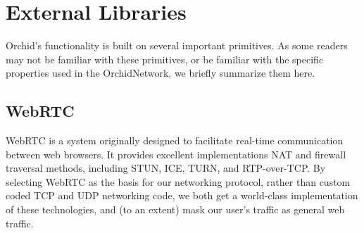 \documentclass{article}
\newcommand{\orchid}{Orchid}
\newcommand{\Orchid}{\orchid}
\begin{document}










\section{External Libraries}
\label{sec:external-libraries}

\Orchid’s functionality is built on several important primitives. As some readers may not be familiar with these primitives, or be familiar with the specific properties used in the \Orchid Network, we briefly summarize them here.

\subsection{WebRTC}

WebRTC \cite{webrtc} is a system originally designed to facilitate real-time communication between web browsers. It provides excellent implementations NAT and firewall traversal methods, including STUN, ICE, TURN, and RTP-over-TCP. By selecting WebRTC as the basis for our networking protocol, rather than custom coded TCP and UDP networking code, we both get a world-class implementation of these technologies, and (to an extent) mask our user's traffic as general web traffic.
\end{document}
